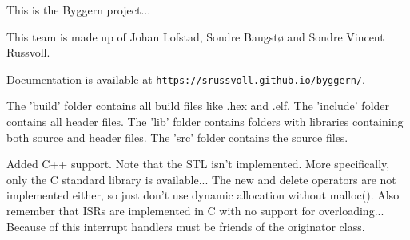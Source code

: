 This is the Byggern project...

This team is made up of Johan Lofstad, Sondre Baugstø and Sondre Vincent Russvoll. 



Documentation is available at \href{https://srussvoll.github.io/byggern/}{\tt https\-://srussvoll.\-github.\-io/byggern/}. 



The 'build' folder contains all build files like .hex and .elf. The 'include' folder contains all header files. The 'lib' folder contains folders with libraries containing both source and header files. The 'src' folder contains the source files. 



Added C++ support. Note that the S\-T\-L isn't implemented. More specifically, only the C standard library is available... The new and delete operators are not implemented either, so just don't use dynamic allocation without malloc(). Also remember that I\-S\-Rs are implemented in C with no support for overloading... Because of this interrupt handlers must be friends of the originator class. 